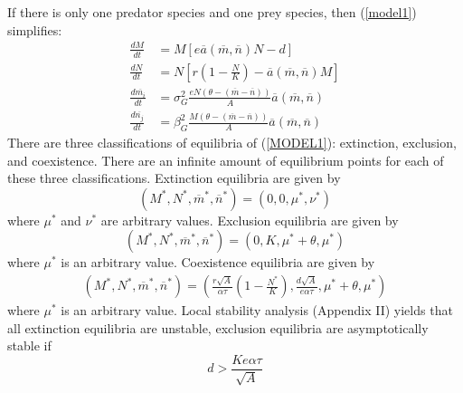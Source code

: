 \documentclass{amsart}
\theoremstyle{definition}
\theoremstyle{remark}
\numberwithin{equation}{section}
\begin{document}
If there is only one predator species and one prey species, then (\ref{model1}) simplifies:
\begin{subequations}
	\label{MODEL1}
	\begin{align}
		\label{eq:MODEL1_A}
		\frac{dM}{dt} &= M\left[e\overline{a}(\overline{m}, \overline{n})N - d\right] \\[5px]
		\label{eq:MODEL1_B}
		\frac{dN}{dt} &= N\left[r\left(1 - \frac{N}{K}\right) - \overline{a}(\overline{m}, \overline{n})M\right] \\[5px]
		\label{eq:MODEL1_C}
		\frac{d\overline{m_i}}{dt} &= \sigma_{G}^2\frac{eN(\theta - (\overline{m} - \overline{n}))}{A}\overline{a}(\overline{m}, \overline{n}) \\[5px]
		\label{eq:MODEL1_D}
		\frac{d\overline{n_j}}{dt} &= \beta_{G}^2\frac{M(\theta - (\overline{m} - \overline{n}))}{A}\overline{a}(\overline{m}, \overline{n})
	\end{align}
\end{subequations}
There are three classifications of equilibria of (\ref{MODEL1}): extinction, exclusion, and coexistence.  There are an infinite amount of equilibrium points for each of these three classifications.  Extinction equilibria are given by
\begin{equation}
	\label{extinction_MODEL1}
	(M^*, N^*, \overline{m}^*, \overline{n}^*) = (0, 0, \mu^*, \nu^*)
\end{equation}
where $\mu^*$ and $\nu^*$ are arbitrary values.  Exclusion equilibria are given by
\begin{equation}
	\label{exclusion_MODEL1}
	(M^*, N^*, \overline{m}^*, \overline{n}^*) = (0, K, \mu^* + \theta, \mu^*)
\end{equation}
where $\mu^*$ is an arbitrary value.  Coexistence equilibria are given by
\begin{equation}
	\label{coexistence_MODEL1}
	\begin{aligned}
		(M^*, N^*, \overline{m}^*, \overline{n}^*) = \left(\frac{r\sqrt{A}}{\alpha\tau}\left(1 - \frac{N^*}{K}\right), \frac{d\sqrt{A}}{e\alpha\tau}, \mu^* + \theta, \mu^*\right)
	\end{aligned}
\end{equation}
where $\mu^*$ is an arbitrary value.  Local stability analysis (Appendix II) yields that all extinction equilibria are unstable, exclusion equilibria are asymptotically stable if
\begin{equation}
	\label{exclusion_stability_MODEL1}
	d > \frac{Ke\alpha\tau}{\sqrt{A}}
\end{equation}
\end{document}
